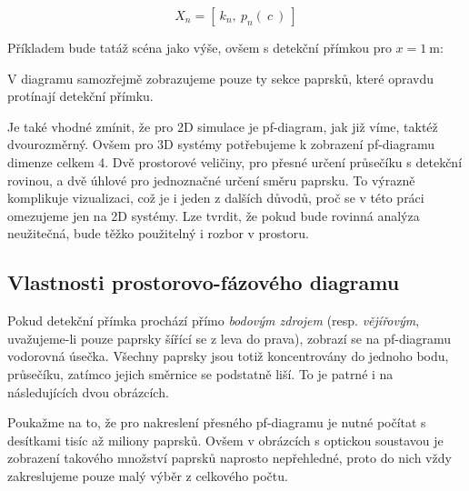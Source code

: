 \[ X_n = [\ k_n,\ p_n(\ c\ )\ ] \]

Příkladem bude tatáž scéna jako výše, ovšem s detekční přímkou pro $x = 1\ \mathrm{m}$:


V diagramu samozřejmě zobrazujeme pouze ty sekce paprsků, které opravdu protínají detekční přímku.

Je také vhodné zmínit, že pro 2D simulace je pf-diagram, jak již víme, taktéž dvourozměrný. Ovšem pro 3D systémy potřebujeme k zobrazení pf-diagramu dimenze celkem 4. Dvě prostorové veličiny, pro přesné určení průsečíku s detekční rovinou, a dvě úhlové pro jednoznačné určení směru paprsku. To výrazně komplikuje vizualizaci, což je i jeden z dalších důvodů, proč se v této práci omezujeme jen na 2D systémy. Lze tvrdit, že pokud bude rovinná analýza neužitečná, bude těžko použitelný i rozbor v prostoru.


\subsection{Vlastnosti prostorovo-fázového diagramu}

Pokud detekční přímka prochází přímo \emph{bodovým zdrojem} (resp. \emph{vějířovým}, uvažujeme-li pouze paprsky šířící se z leva do prava), zobrazí se na pf-diagramu vodorovná úsečka. Všechny paprsky jsou totiž koncentrovány do jednoho bodu, průsečíku, zatímco jejich směrnice se podstatně liší. To je patrné i na následujících dvou obrázcích.

Poukažme na to, že pro nakreslení přesného pf-diagramu je nutné počítat s desítkami tisíc až miliony paprsků. Ovšem v obrázcích s optickou soustavou je zobrazení takového množství paprsků naprosto nepřehledné, proto do nich vždy zakreslujeme pouze malý výběr z celkového počtu.


